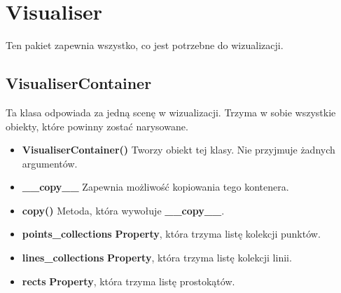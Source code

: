 \documentclass[a4paper, 12pt]{article}
\begin{document}
  \section{Visualiser}
    Ten pakiet zapewnia wszystko, co jest potrzebne do wizualizacji. 

    \subsection{VisualiserContainer}
      Ta klasa odpowiada za jedną scenę w wizualizacji. Trzyma w sobie wszystkie obiekty, które powinny zostać narysowane.

      \begin{itemize}
          \item \textbf{VisualiserContainer()} \vspace{6pt}\newline
          \quad Tworzy obiekt tej klasy. Nie przyjmuje żadnych argumentów.\vspace{6pt}
          
          \item \textbf{\_\_copy\_\_} \vspace{6pt}\newline
          \quad Zapewnia możliwość kopiowania tego kontenera.\vspace{6pt}
          
          \item \textbf{copy()} \vspace{6pt}\newline
          \quad Metoda, która wywołuje \textbf{\_\_copy\_\_}.\vspace{6pt}
          
          \item \textbf{points\_collections} \vspace{6pt}\newline
          \quad \textbf{Property}, która trzyma listę kolekcji punktów.\vspace{6pt}
          
          \item \textbf{lines\_collections} \vspace{6pt}\newline
          \quad \textbf{Property}, która trzyma listę kolekcji linii.\vspace{6pt}
          
          \item \textbf{rects} \vspace{6pt}\newline
          \quad \textbf{Property}, która trzyma listę prostokątów.\vspace{6pt}
          

\end{itemize}
\end{document}
